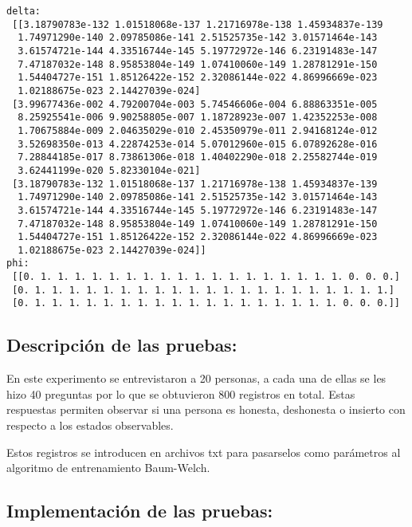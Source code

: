 \documentclass[11pt]{article}
\newcommand{\prompt}[4]{
        \llap{{\color{#2}[#3]: #4}}\vspace{-1.25em}
    }
\begin{document}
\begin{Verbatim}[commandchars=\\\{\}]
 delta:
 [[3.18790783e-132 1.01518068e-137 1.21716978e-138 1.45934837e-139
  1.74971290e-140 2.09785086e-141 2.51525735e-142 3.01571464e-143
  3.61574721e-144 4.33516744e-145 5.19772972e-146 6.23191483e-147
  7.47187032e-148 8.95853804e-149 1.07410060e-149 1.28781291e-150
  1.54404727e-151 1.85126422e-152 2.32086144e-022 4.86996669e-023
  1.02188675e-023 2.14427039e-024]
 [3.99677436e-002 4.79200704e-003 5.74546606e-004 6.88863351e-005
  8.25925541e-006 9.90258805e-007 1.18728923e-007 1.42352253e-008
  1.70675884e-009 2.04635029e-010 2.45350979e-011 2.94168124e-012
  3.52698350e-013 4.22874253e-014 5.07012960e-015 6.07892628e-016
  7.28844185e-017 8.73861306e-018 1.40402290e-018 2.25582744e-019
  3.62441199e-020 5.82330104e-021]
 [3.18790783e-132 1.01518068e-137 1.21716978e-138 1.45934837e-139
  1.74971290e-140 2.09785086e-141 2.51525735e-142 3.01571464e-143
  3.61574721e-144 4.33516744e-145 5.19772972e-146 6.23191483e-147
  7.47187032e-148 8.95853804e-149 1.07410060e-149 1.28781291e-150
  1.54404727e-151 1.85126422e-152 2.32086144e-022 4.86996669e-023
  1.02188675e-023 2.14427039e-024]]
phi:
 [[0. 1. 1. 1. 1. 1. 1. 1. 1. 1. 1. 1. 1. 1. 1. 1. 1. 1. 1. 0. 0. 0.]
 [0. 1. 1. 1. 1. 1. 1. 1. 1. 1. 1. 1. 1. 1. 1. 1. 1. 1. 1. 1. 1. 1.]
 [0. 1. 1. 1. 1. 1. 1. 1. 1. 1. 1. 1. 1. 1. 1. 1. 1. 1. 1. 0. 0. 0.]]
\end{Verbatim}

    \hypertarget{descripciuxf3n-de-las-pruebas}{%
\subsection{Descripción de las
pruebas:}\label{descripciuxf3n-de-las-pruebas}}

En este experimento se entrevistaron a 20 personas, a cada una de ellas
se les hizo 40 preguntas por lo que se obtuvieron 800 registros en
total. Estas respuestas permiten observar si una persona es honesta,
deshonesta o insierto con respecto a los estados observables.

Estos registros se introducen en archivos txt para pasarselos como
parámetros al algoritmo de entrenamiento Baum-Welch.

    \hypertarget{implementaciuxf3n-de-las-pruebas}{%
\subsection{Implementación de las pruebas:}\label{implementaciuxf3n-de-las-pruebas}}

    \begin{tcolorbox}[breakable, size=fbox, boxrule=1pt, pad at break*=1mm,colback=cellbackground, colframe=cellborder]
\prompt{In}{incolor}{ }{\hspace{4pt}}
\begin{Verbatim}[commandchars=\\\{\}]

\end{Verbatim}
\end{tcolorbox}


    
    
    
    
\end{document}
